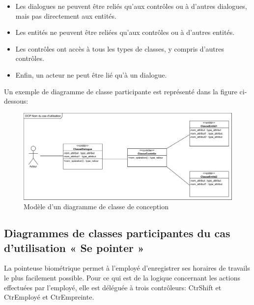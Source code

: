 \begin{itemize}
    \item[\textbullet] Les dialogues ne peuvent être reliés qu'aux contrôles ou à 
        d'autres dialogues, mais pas directement aux entités.
    \item [\textbullet] Les entités ne peuvent être reliées qu'aux contrôles ou à 
        d'autres entités.
    \item [\textbullet] Les contrôles ont accès à tous les types de classes, y 
        compris d'autres contrôles.
    \item [\textbullet] Enfin, un acteur ne peut être lié qu'à un dialogue.
\end{itemize}

Un exemple de diagramme de classe participante est représenté dans la figure 
ci-dessous:  

\begin{figure}[h!]
    \centering
    \includegraphics[scale=0.78]{images/DCP_exemple.png}
    \caption{Modèle d'un diagramme de classe de conception}
    \label{fig23}
\end{figure}

\clearpage

\subsection*{Diagrammes de classes participantes du cas d'utilisation « Se pointer »}
La pointeuse biométrique permet à l’employé d’enregistrer ses horaires de 
travails le plus facilement possible. Pour ce qui est de la logique concernant 
les actions effectuées par l’employé, elle est déléguée à trois contrôleurs: 
CtrShift et CtrEmployé et CtrEmpreinte.
            
